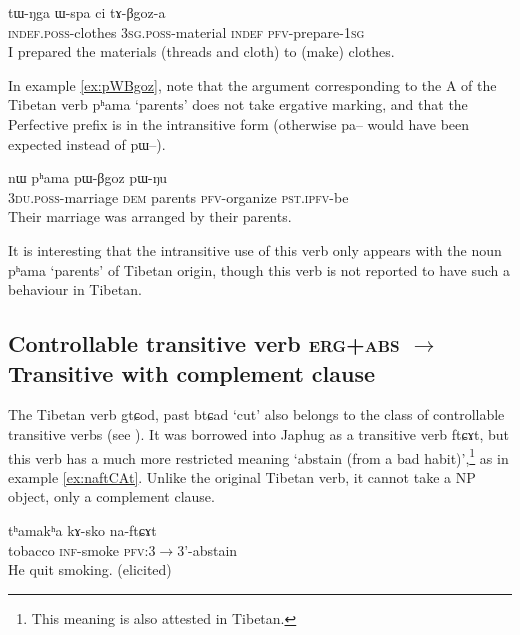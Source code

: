 \documentclass[oldfontcommands,oneside,a4paper,11pt]{article}
\newcommand{\ipa}[1]{{\phon \mbox{#1}}} %
\begin{document}
\begin{exe}
\ex \label{ex:tABgoza}
\gll
\ipa{tɯ-ŋga} 	\ipa{ɯ-spa} 	\ipa{ci} 	\ipa{tɤ-βgoz-a} \\
\textsc{indef.poss}-clothes \textsc{3sg.poss}-material \textsc{indef} \textsc{pfv}-prepare-\textsc{1sg} \\
\glt I prepared the materials (threads and cloth) to (make) clothes.
\end{exe}

In example \ref{ex:pWBgoz}, note that the argument corresponding to the A of the Tibetan verb \ipa{pʰama} `parents' does not take ergative marking, and that the Perfective prefix is in the intransitive form (otherwise \ipa{pa--} would have been expected instead of \ipa{pɯ--}).

\begin{exe}
\ex \label{ex:pWBgoz}
\gll \ipa{ndʑi-stɯnmɯ} 	\ipa{nɯ} 	\ipa{pʰama} 	\ipa{pɯ-βgoz} 	\ipa{pɯ-ŋu} \\
\textsc{3du.poss}-marriage \textsc{dem} parents \textsc{pfv}-organize \textsc{pst.ipfv}-be \\
\glt Their marriage was arranged by their parents.
\end{exe}


It is interesting that the intransitive use of this verb only appears with the noun \ipa{pʰama} `parents' of Tibetan origin, though this verb is not reported to have such a behaviour in Tibetan.



\subsection{Controllable transitive verb \textsc{erg+abs}  $\rightarrow$ Transitive with complement clause}
The Tibetan verb \ipa{gtɕod}, past \ipa{btɕad} `cut' also belongs to the class of controllable transitive verbs (see \citealt[86:187]{haller04themchen}). It was borrowed into Japhug as a transitive verb \ipa{ftɕɤt}, but this verb has a much more restricted meaning `abstain (from a bad habit)',\footnote{This meaning is also attested in Tibetan.} as in example \ref{ex:naftCAt}. Unlike the original Tibetan verb, it cannot take a NP object, only a complement clause.

\begin{exe}
\ex \label{ex:naftCAt}
\gll
\ipa{tʰamakʰa} \ipa{kɤ-sko} \ipa{na-ftɕɤt}\\
tobacco \textsc{inf}-smoke \textsc{pfv}:3$\rightarrow$3'-abstain \\
\glt He quit smoking. (elicited)
\end{exe}
\end{document}
